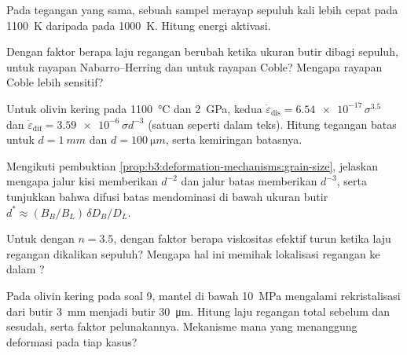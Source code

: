\begin{exercise}[$\star\star$]\label{exo:b3:deformation-mechanisms:7}
Pada tegangan yang sama, sebuah sampel merayap sepuluh kali lebih cepat pada \qty{1100}{K} daripada
pada \qty{1000}{K}. Hitung energi aktivasi.
\end{exercise}

\begin{exercise}[$\star\star$]\label{exo:b3:deformation-mechanisms:8}
Dengan faktor berapa laju regangan  berubah ketika ukuran butir
dibagi sepuluh, untuk rayapan Nabarro--Herring dan untuk rayapan Coble? Mengapa
rayapan Coble lebih sensitif?
\end{exercise}

\begin{exercise}[$\star\star$]\label{exo:b3:deformation-mechanisms:9}
Untuk olivin kering pada \qty{1100}{\celsius} dan \qty{2}{GPa}, kedua 
$\dot\varepsilon_{\mathrm{dis}} = \num{6.54e-17}\,\sigma^{3.5}$ dan
$\dot\varepsilon_{\mathrm{dif}} = \num{3.59e-6}\,\sigma d^{-3}$ (satuan seperti dalam
teks). Hitung tegangan batas untuk $d = \qty{1}{mm}$ dan $d =
\qty{100}{\micro m}$, serta kemiringan batasnya.
\end{exercise}

\begin{exercise}[$\star\star\star$]\label{exo:b3:deformation-mechanisms:10}
Mengikuti pembuktian \cref{prop:b3:deformation-mechanisms:grain-size},
jelaskan mengapa jalur kisi memberikan $d^{-2}$ dan jalur batas memberikan $d^{-3}$, serta
tunjukkan bahwa difusi batas mendominasi di bawah ukuran butir $d^* \approx
(B_B/B_L)\,\delta D_B/D_L$.
\end{exercise}

\begin{exercise}[$\star\star\star$]\label{exo:b3:deformation-mechanisms:11}
Untuk  dengan $n = 3.5$, dengan faktor berapa viskositas efektif turun
ketika laju regangan dikalikan sepuluh? Mengapa hal ini memihak
lokalisasi regangan ke dalam ?
\end{exercise}

\begin{exercise}[$\star\star\star$]\label{exo:b3:deformation-mechanisms:12}
Pada olivin kering pada soal 9,  mantel di bawah \qty{10}{MPa}
mengalami rekristalisasi dari butir \qty{3}{mm} menjadi butir \qty{30}{\micro m}. Hitung
laju regangan total sebelum dan sesudah, serta faktor pelunakannya. Mekanisme mana
yang menanggung deformasi pada tiap kasus?
\end{exercise}

